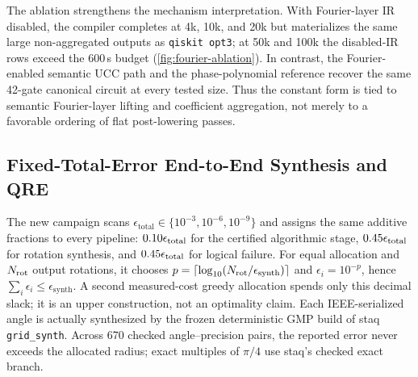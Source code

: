 \documentclass[aps,prx,reprint,floatfix,superscriptaddress]{revtex4-2}
\begin{document}
The ablation strengthens the mechanism interpretation. With Fourier-layer
IR disabled, the compiler completes at 4k, 10k, and 20k but materializes
the same large non-aggregated outputs as \texttt{qiskit opt3}; at 50k
and 100k the disabled-IR rows exceed the 600\,s budget
(\cref{fig:fourier-ablation}). In contrast, the Fourier-enabled semantic
UCC path and the phase-polynomial reference recover the same 42-gate
canonical circuit at every tested size. Thus the constant form is tied
to semantic Fourier-layer lifting and coefficient aggregation, not
merely to a favorable ordering of flat post-lowering passes.

\subsection{Fixed-Total-Error End-to-End Synthesis and QRE}

\begin{table}[t]
\centering
\scriptsize
{}
\caption{Predeclared 20k representative slice of the fixed-total-error
campaign: $\epsilon_{\rm total}=10^{-6}$, equal synthesis allocation,
conservative $p_{\rm phys}=10^{-3}$ scenario, and 16 factories.  Each compiled
output has an independent certificate, and every unique-angle staq synthesis
returns \texttt{Check flag = 1}.  Runtime is modeled quantum execution time,
not classical compilation time.}
\label{tab:resource-consequence}
\end{table}

The new campaign scans
$\epsilon_{\mathrm{total}}\in\{10^{-3},10^{-6},10^{-9}\}$ and assigns the
same additive fractions to every pipeline:
$0.10\epsilon_{\rm total}$ for the certified algorithmic stage,
$0.45\epsilon_{\rm total}$ for rotation synthesis, and
$0.45\epsilon_{\rm total}$ for logical failure.  For equal allocation and
$N_{\rm rot}$ output rotations, it chooses
$p=\lceil\log_{10}(N_{\rm rot}/\epsilon_{\mathrm{synth}})\rceil$ and
$\epsilon_i=10^{-p}$, hence
$\sum_i\epsilon_i\leq\epsilon_{\mathrm{synth}}$.  A second measured-cost
greedy allocation spends only this decimal slack; it is an upper construction,
not an optimality claim.  Each IEEE-serialized angle is actually synthesized
by the frozen deterministic GMP build of staq \texttt{grid\_synth}.  Across
670 checked angle--precision pairs, the reported error never exceeds the
allocated radius; exact multiples of $\pi/4$ use staq's checked exact branch.
\end{document}

